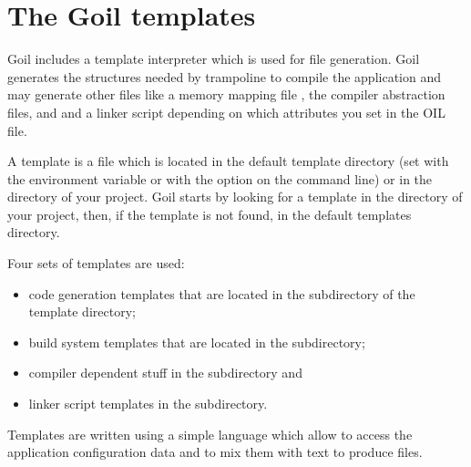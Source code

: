 
\chapter{The Goil templates}

Goil includes a template interpreter which is used for file generation. Goil generates the structures needed by trampoline to compile the application and may generate other files like a memory mapping file , the compiler abstraction files,  and  and a linker script depending on which attributes you set in the OIL file. 

A template is a file which is located in the default template directory (set with the environment variable  or with the  option on the command line) or in the directory of your project. Goil starts by looking for a template in the directory of your project, then, if the template is not found, in the default templates directory.

Four sets of templates are used:
\begin{itemize}
\item code generation templates that are located in the  subdirectory of the template directory;
\item build system templates that are located in the  subdirectory;
\item compiler dependent stuff in the  subdirectory and
\item linker script templates in the  subdirectory.
\end{itemize}

Templates are written using a simple language which allow to access the application configuration data and to mix them with text to produce files.

